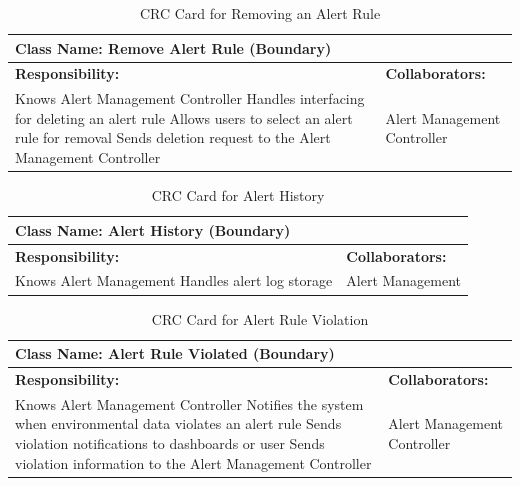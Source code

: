 \documentclass[]{article}
\begin{document}
\begin{table}[H]
    \centering
    \caption{CRC Card for Removing an Alert Rule}
    \vspace{1mm}
    \begin{tabular}{|p{7.5cm}|p{7.5cm}|}
    \hline 
      \multicolumn{2}{|l|}{\textbf{Class Name: Remove Alert Rule (Boundary)}} \\
    \hline
    \textbf{Responsibility:} & \textbf{Collaborators:} \\
    \hline
		Knows Alert Management Controller \newline
        Handles interfacing for deleting an alert rule \newline
        Allows users to select an alert rule for removal \newline
        Sends deletion request to the Alert Management Controller \newline
        & 
        Alert Management Controller \\
    \hline
    \end{tabular}
\end{table}
\begin{table}[H]
    \centering
    \caption{CRC Card for Alert History}
    \vspace{1mm}
    \begin{tabular}{|p{7.5cm}|p{7.5cm}|}
    \hline 
      \multicolumn{2}{|l|}{\textbf{Class Name: Alert History (Boundary)}} \\
    \hline
    \textbf{Responsibility:} & \textbf{Collaborators:} \\
    \hline
        Knows Alert Management \newline
        Handles alert log storage \newline        
        & 
        Alert Management \\
    \hline
    \end{tabular}
\end{table}
\begin{table}[H]
    \centering
    \caption{CRC Card for Alert Rule Violation}
    \vspace{1mm}
    \begin{tabular}{|p{7.5cm}|p{7.5cm}|}
    \hline 
      \multicolumn{2}{|l|}{\textbf{Class Name: Alert Rule Violated (Boundary)}} \\
    \hline
    \textbf{Responsibility:} & \textbf{Collaborators:} \\
    \hline
		Knows Alert Management Controller \newline
        Notifies the system when environmental data violates an alert rule \newline
        Sends violation notifications to dashboards or user \newline
        Sends violation information to the Alert Management Controller \newline
        & 
        Alert Management Controller \\
    \hline
    \end{tabular}
\end{table}
\end{document}
